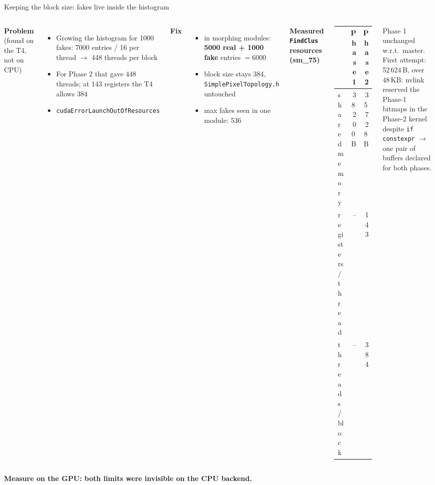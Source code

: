 \documentclass[aspectratio=169,10pt,xcolor=table]{beamer}
\newcommand{\pos}[1]{\textcolor{cbBlue}{#1}}
\newcommand{\con}[1]{\textcolor{cbOrange}{#1}}
\newcommand{\takeaway}[1]{\begin{center}\color{cmsblue}\textbf{#1}\end{center}}
\newcommand{\code}[1]{\texttt{\small #1}}
\begin{document}
\begin{frame}{Keeping the block size: fakes live inside the histogram}
  \begin{columns}[T]
    \textbf{Problem} (found on the T4, not on CPU)
    \begin{itemize}
      \item Growing the histogram for 1000 fakes: 7000 entries / 16 per thread $\to$ 448 threads per block
      \item For Phase 2 that gave 448 threads; at 143 registers the T4 allows 384
      \item \con{\code{cudaErrorLaunchOutOfResources}}
    \end{itemize}
    \textbf{Fix}
    \begin{itemize}
      \item in morphing modules: \textbf{5000 real + 1000 fake} entries $=6000$
      \item block size stays 384, \code{SimplePixelTopology.h} untouched
      \item max fakes seen in one module: 536
    \end{itemize}
    \textbf{Measured \code{FindClus} resources (sm\_75)}
    \vspace{4pt}
    \begin{center}\small
    \begin{tabular}{@{}lrr@{}}
      \toprule
      & Phase 1 & Phase 2 \\
      \midrule
      shared memory & 38\,200\,B & 35\,728\,B \\
      registers/thread & -- & 143 \\
      threads/block & -- & 384 \\
      \bottomrule
    \end{tabular}
    \end{center}
    {\small Phase 1 unchanged w.r.t.\ master. First attempt: 52\,624\,B, \con{over 48\,KB}: nvlink reserved the Phase-1 bitmaps in the Phase-2 kernel despite \code{if constexpr} $\to$ \pos{one pair of buffers declared for both phases.}}
  \end{columns}
  \takeaway{Measure on the GPU: both limits were invisible on the CPU backend.}
\end{frame}

\end{document}
